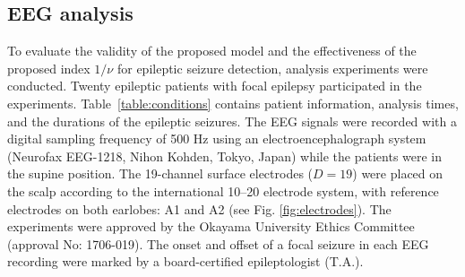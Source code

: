 \documentclass[journal]{IEEEtran}
\begin{document}
\subsection{EEG analysis}
To evaluate the validity of the proposed model and the effectiveness of the proposed index $1/\nu$ for epileptic seizure detection, analysis experiments were conducted.
Twenty epileptic patients with focal epilepsy participated in the experiments.
Table~\ref{table:conditions} contains patient information, analysis times, and the durations of the epileptic seizures.
The EEG signals were recorded with a digital sampling frequency of 500 Hz using an electroencephalograph system (Neurofax EEG-1218, Nihon Kohden, Tokyo, Japan) while the patients were in the supine position.
The 19-channel surface electrodes ($D=19$) were placed on the scalp according to the international 10--20 electrode system, with reference electrodes on both earlobes: A1 and A2 (see Fig. \ref{fig:electrodes}).
The experiments were approved by the Okayama University Ethics Committee (approval No: 1706-019). The onset and offset of a focal seizure in each EEG recording were marked by a board-certified epileptologist (T.A.).
\end{document}
